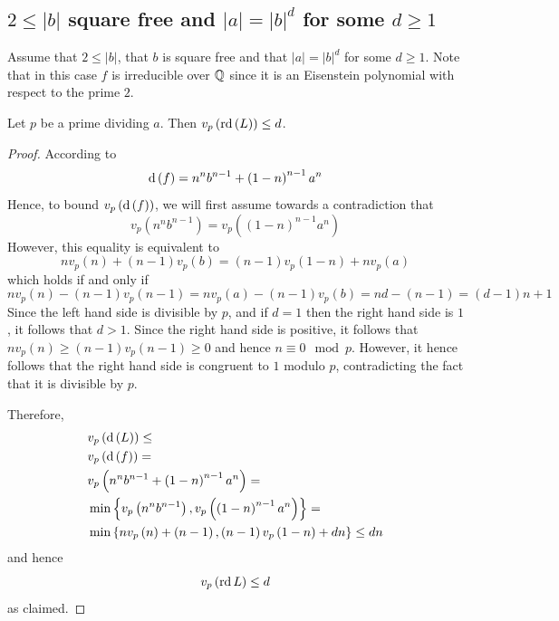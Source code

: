 \documentclass[../main.tex]{subfiles}
\begin{document}
\subsection{$2 \leq \left| b \right|$ square free and $\left| a \right| = \left| b \right|^d$ for some $d \geq 1$}
Assume that $2 \leq \left| b \right|$, that $b$ is square free and that $\left| a \right| = \left| b \right|^d$ for some $d \geq 1$.
Note that in this case $f$ is irreducible over $\mathbb{Q}$ since it is an Eisenstein polynomial with respect to the prime $2$.
\begin{lemma}
  \label{lem:valuation_of_rd_when_a_equal_b_is_square_free}
  Let $p$ be a prime dividing $a$.
  Then $v_p\left( \operatorname{\rm rd}\left( L \right) \right) \leq d$.
\end{lemma}
\begin{proof}
  According to \cite{Swan62} 
  \[
    \operatorname{\rm d}\left( f \right) = n^n b^{n-1} + \left( 1 - n \right)^{n - 1} a^n
  \]
  Hence, to bound $v_p\left( \operatorname{\rm d}\left( f \right) \right)$, we will first assume towards a contradiction that
  \[
    v_p\left( n^n b^{n-1} \right) = v_p\left( \left( 1 - n \right)^{n - 1} a^n \right)
  \]
  However, this equality is equivalent to
  \[
    n v_p\left( n \right) + \left( n - 1 \right)v_p\left( b \right) = \left( n - 1 \right) v_p\left( 1 - n \right) + n v_p\left( a \right)
  \]
  which holds if and only if
  \[
    n v_p\left( n \right) - \left( n - 1 \right)v_p\left( n-1 \right) = n v_p\left( a \right) - \left( n - 1 \right)v_p\left( b \right) = n d - \left( n - 1 \right) = \left( d - 1 \right) n + 1 
  \]
  Since the left hand side is divisible by $p$, and if $d = 1$ then the right hand side is $1$, it follows that $d > 1$.
  Since the right hand side is positive, it follows that $n v_p\left( n \right) \geq \left( n - 1 \right)v_p\left( n - 1 \right) \geq 0$ and hence $n \equiv 0 \mod p$.
  However, it hence follows that the right hand side is congruent to $1$ modulo $p$, contradicting the fact that it is divisible by $p$.
  
  Therefore, 
  \begin{align*}
    & v_p\left( \operatorname{\rm d}\left( L \right) \right) \leq \\
    & v_p\left( \operatorname{\rm d}\left( f \right) \right) = \\
    & v_p\left( n^n b^{n-1} + \left( 1 - n \right)^{n - 1} a^n \right) = \\
    & \min\left\{ v_p\left( n^n b^{n-1} \right), v_p\left( \left( 1 - n \right)^{n - 1} a^n \right) \right\} = \\
    & \min\left\{ 
      n v_p\left( n \right) + \left( n - 1 \right), 
      \left( n - 1 \right) v_p\left( 1 - n \right) + dn 
    \right\} \leq d n
  \end{align*}
  and hence 
  \[
    v_p\left( \operatorname{\rm rd} L \right) \leq d
  \]
  as claimed.
\end{proof} 
\end{document}
